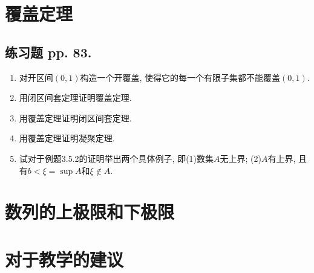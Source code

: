 \documentclass[a4paper,11pt,twoside]{ctexbook}
\begin{document}
\section{覆盖定理}
\subsection{练习题 pp. 83.}
\begin{enumerate}
	\item 对开区间$(0,1)$构造一个开覆盖, 使得它的每一个有限子集都不能覆盖$(0,1)$.

	\item 用闭区间套定理证明覆盖定理.

	\item 用覆盖定理证明闭区间套定理.

	\item 用覆盖定理证明凝聚定理.

	\item 试对于例题3.5.2的证明举出两个具体例子, 即(1)数集$A$无上界; (2)$A$有上界, 且有$b<\xi=\sup{A}$和$\xi\notin A$.
\end{enumerate}

\section{数列的上极限和下极限}

\section{对于教学的建议}
\end{document}
